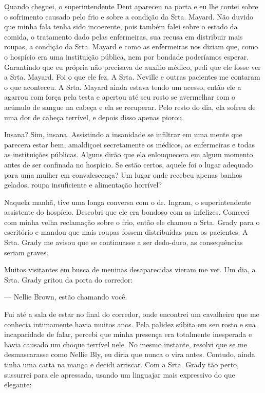 Quando cheguei, o superintendente Dent apareceu na porta e eu lhe contei
sobre o sofrimento causado pelo frio e sobre a condição da Srta. Mayard.
Não duvido que minha fala tenha sido incoerente, pois também falei sobre
o estado da comida, o tratamento dado pelas enfermeiras, sua recusa em
distribuir mais roupas, a condição da Srta. Mayard e como as enfermeiras
nos diziam que, como o hospício era uma instituição pública, nem por
bondade poderíamos esperar. Garantindo que eu própria não precisava de
auxílio médico, pedi que ele fosse ver a Srta. Mayard. Foi o que ele
fez. A Srta. Neville e outras pacientes me contaram o que aconteceu. A
Srta. Mayard ainda estava tendo um acesso, então ele a agarrou com força
pela testa e apertou até seu rosto se avermelhar com o acúmulo de sangue
na cabeça e ela se recuperar. Pelo resto do dia, ela sofreu de uma dor
de cabeça terrível, e depois disso apenas piorou.

Insana? Sim, insana. Assistindo a insanidade se infiltrar em uma mente
que parecera estar bem, amaldiçoei secretamente os médicos, as
enfermeiras e todas as instituições públicas. Alguns dirão que ela
enlouquecera em algum momento antes de ser confinada no hospício. Se
estão certos, aquele foi o lugar adequado para uma mulher em
convalescença? Um lugar onde recebeu apenas banhos gelados, roupa
insuficiente e alimentação horrível?

Naquela manhã, tive uma longa conversa com o dr. Ingram, o
superintendente assistente do hospício. Descobri que ele era bondoso com
as infelizes. Comecei com minha velha reclamação sobre o frio, então ele
chamou a Srta. Grady para o escritório e mandou que mais roupas fossem
distribuídas para os pacientes. A Srta. Grady me avisou que se
continuasse a ser dedo-duro, as consequências seriam graves.

Muitos visitantes em busca de meninas desaparecidas vieram me ver. Um
dia, a Srta. Grady gritou da porta do corredor:

--- Nellie Brown, estão chamando você.

Fui até a sala de estar no final do corredor, onde encontrei um
cavalheiro que me conhecia intimamente havia muitos anos. Pela palidez
súbita em seu rosto e sua incapacidade de falar, percebi que minha
presença era totalmente inesperada e havia causado um choque terrível
nele. No mesmo instante, resolvi que se me desmascarasse como Nellie
Bly, eu diria que nunca o vira antes. Contudo, ainda tinha uma carta na
manga e decidi arriscar. Com a Srta. Grady tão perto, sussurrei para ele
apressada, usando um linguajar mais expressivo do que elegante:

